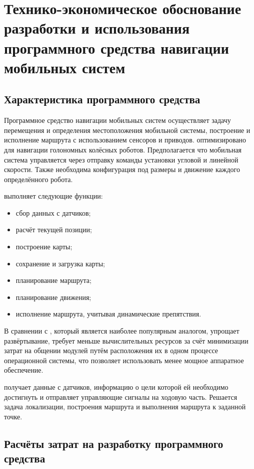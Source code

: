 \section{Технико-экономическое обоснование разработки и использования
программного средства навигации мобильных систем}

\subsection{Характеристика программного средства}
Программное средство навигации мобильных систем осуществляет задачу перемещения
и определения местоположения мобильной системы, построение и исполнение 
маршрута с использованием сенсоров и приводов. \appname{} оптимизировано для
навигации голономных колёсных роботов. Предполагается что мобильная система 
управляется через отправку команды установки угловой и линейной скорости. 
Также необходима конфигурация под размеры и движение каждого определённого
робота.

\appname{} выполняет следующие функции:

\begin{itemize}
	\item сбор данных с датчиков;
	\item расчёт текущей позиции;
	\item построение карты;
	\item сохранение и загрузка карты;
	\item планирование маршрута;
	\item планирование движения;
	\item исполнение маршрута, учитывая динамические препятствия.
\end{itemize}


В сравнении с \ros{}, который является наиболее популярным аналогом, \appname{}
упрощает развёртывание, требует меньше вычислительных ресурсов за счёт
минимизации затрат на общении модулей путём расположения их в одном процессе
операционной системы, что позволяет использовать менее мощное аппаратное
обеспечение.

\appname{} получает данные с датчиков, информацию о цели которой ей 
необходимо достигнуть  и отправляет управляющие сигналы на ходовую часть. 
Решается задача локализации, построения маршрута и выполнения маршрута 
к заданной точке. 

\subsection{Расчёты затрат на разработку программного средства}

